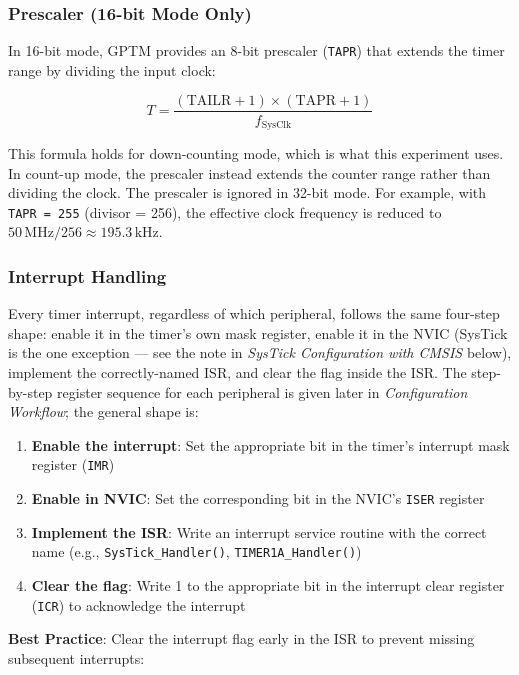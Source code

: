 \subsubsection{Prescaler (16-bit Mode Only)}

In 16-bit mode, GPTM provides an 8-bit prescaler (\texttt{TAPR}) that extends the timer range by dividing the input clock:

\[
T = \frac{(\text{TAILR} + 1) \times (\text{TAPR} + 1)}{f_{\text{SysClk}}}
\]

\noindent
This formula holds for down-counting mode, which is what this experiment uses. In count-up mode, the prescaler instead extends the counter range rather than dividing the clock. The prescaler is ignored in 32-bit mode. For example, with \texttt{TAPR = 255} (divisor = 256), the effective clock frequency is reduced to $50\,\text{MHz} / 256 \approx 195.3\,\text{kHz}$.

\subsubsection{Interrupt Handling}

Every timer interrupt, regardless of which peripheral, follows the same four-step shape: enable it in the timer's own mask register, enable it in the NVIC (SysTick is the one exception — see the note in \textit{SysTick Configuration with CMSIS} below), implement the correctly-named ISR, and clear the flag inside the ISR. The step-by-step register sequence for each peripheral is given later in \textit{Configuration Workflow}; the general shape is:

\begin{enumerate}[nosep]
  \item \textbf{Enable the interrupt}: Set the appropriate bit in the timer's interrupt mask register (\texttt{IMR})
  \item \textbf{Enable in NVIC}: Set the corresponding bit in the NVIC's \texttt{ISER} register
  \item \textbf{Implement the ISR}: Write an interrupt service routine with the correct name (e.g., \texttt{SysTick\_Handler()}, \texttt{TIMER1A\_Handler()})
  \item \textbf{Clear the flag}: Write 1 to the appropriate bit in the interrupt clear register (\texttt{ICR}) to acknowledge the interrupt
\end{enumerate}

\noindent
\textbf{Best Practice}: Clear the interrupt flag early in the ISR to prevent missing subsequent interrupts:

